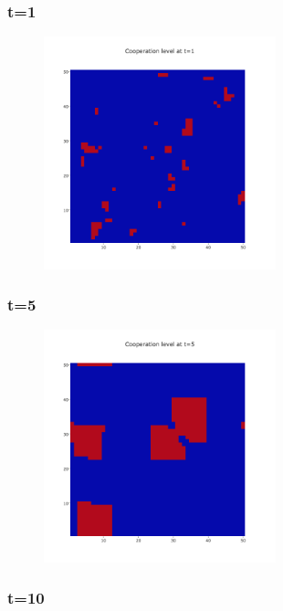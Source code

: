 \documentclass[11pt]{article}
\begin{document}
\subsubsection{t=1}

\begin{figure}[H]
\centering
   \includegraphics[width=0.6\textwidth]{img/part1/cf-moore-visu-1.png}
\end{figure}

\subsubsection{t=5}

\begin{figure}[H]
\centering
   \includegraphics[width=0.6\textwidth]{img/part1/cf-moore-visu-5.png}
\end{figure}

\subsubsection{t=10}
\end{document}
